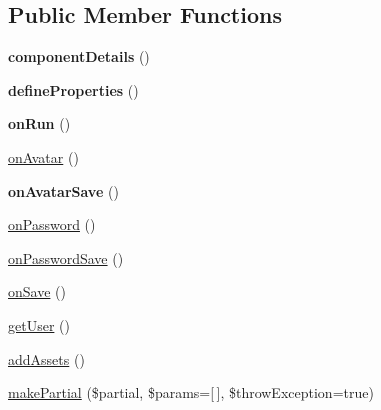 \subsection*{Public Member Functions}
\begin{DoxyCompactItemize}
\item 
\hypertarget{classDMA_1_1Friends_1_1Components_1_1UserProfile_a003e4e1407485743aaf55685f88787a4}{}{\bfseries component\+Details} ()\label{classDMA_1_1Friends_1_1Components_1_1UserProfile_a003e4e1407485743aaf55685f88787a4}

\item 
\hypertarget{classDMA_1_1Friends_1_1Components_1_1UserProfile_aecf1a686a45e5426a3c2f28a079e26ce}{}{\bfseries define\+Properties} ()\label{classDMA_1_1Friends_1_1Components_1_1UserProfile_aecf1a686a45e5426a3c2f28a079e26ce}

\item 
\hypertarget{classDMA_1_1Friends_1_1Components_1_1UserProfile_a32ac3402bed889d632b04caed5c38722}{}{\bfseries on\+Run} ()\label{classDMA_1_1Friends_1_1Components_1_1UserProfile_a32ac3402bed889d632b04caed5c38722}

\item 
\hyperlink{classDMA_1_1Friends_1_1Components_1_1UserProfile_a8762bd608981dc640c3fb5d86090649e}{on\+Avatar} ()
\item 
\hypertarget{classDMA_1_1Friends_1_1Components_1_1UserProfile_a608fc1f7abe812d81cf14b8810d4e495}{}{\bfseries on\+Avatar\+Save} ()\label{classDMA_1_1Friends_1_1Components_1_1UserProfile_a608fc1f7abe812d81cf14b8810d4e495}

\item 
\hyperlink{classDMA_1_1Friends_1_1Components_1_1UserProfile_af07aef56eea64e63a102c3f4f5d4ee4e}{on\+Password} ()
\item 
\hyperlink{classDMA_1_1Friends_1_1Components_1_1UserProfile_ad43136888e9abbd354167db885b1d0ee}{on\+Password\+Save} ()
\item 
\hyperlink{classDMA_1_1Friends_1_1Components_1_1UserProfile_aeb1223b998f0e1e5eff79d84bda27011}{on\+Save} ()
\item 
\hyperlink{classDMA_1_1Friends_1_1Components_1_1UserProfile_a5ae2f68ad0cfa8793553ff64933a8f59}{get\+User} ()
\item 
\hyperlink{classDMA_1_1Friends_1_1Components_1_1UserProfile_a1515663484c8d01a49e4d1824a6e7c1b}{add\+Assets} ()
\item 
\hyperlink{classDMA_1_1Friends_1_1Components_1_1UserProfile_a470d38c86107683dfa599a9140ae02a0}{make\+Partial} (\$partial, \$params=\mbox{[}$\,$\mbox{]}, \$throw\+Exception=true)
\end{DoxyCompactItemize}

